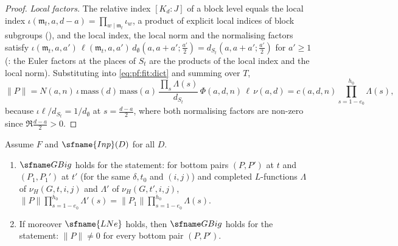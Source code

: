 \begin{proof}
\emph{Local factors.} The relative index $[K_d:J]$ of a block level equals the local index
$\iota(\mathfrak m_t,a,d-a)=\prod_{w\mid\mathfrak m_t}\iota_w$, a product of explicit local indices of block subgroups
(), and the local index, the local norm and the normalising factors satisfy
$\iota(\mathfrak m_t,a,a')\,\ell(\mathfrak m_t,a,a')\,d_\emptyset(a,a+a';\tfrac{a'}2)=d_{S_t}(a,a+a';\tfrac{a'}2)$ for $a'\ge1$
(: the Euler factors at the places of $S_t$ are the
products of the local index and the local norm). Substituting into \eqref{eq:pf:fit:dict} and summing over $T$,
\[
\|P\|=N(a,n)\,\iota\,\mathrm{mass}(d)\,\mathrm{mass}(a)\,\frac{\prod_s\Lambda(s)}{d_{S_t}}\,\Phi(a,d,n)\,\ell\,\nu(a,d)
=c(a,d,n)\prod_{s=1-e_0}^{h_0}\Lambda(s),
\]
because $\iota\ell/d_{S_t}=1/d_\emptyset$ at $s=\tfrac{d-a}2$, where both normalising factors are non-zero since $\Re\tfrac{d-a}2>0$.
\end{proof}

\begin{lemma}\label{pf:fit:petratio}
Assume $F$ and $\sfname{Inp}(D)$ for all $D$.
\begin{enumerate}[label=(\alph*)]
\item $\fitGBig$ holds for the statement: for bottom pairs $(P,P')$ at $t$ and $(P_1,P_1')$ at $t'$ (for the same $\delta,t_0$
and $(i,j)$) and completed $L$-functions $\Lambda$ of $\nu_H(G,t,i,j)$ and $\Lambda'$ of $\nu_H(G,t',i,j)$,
$\|P\|\prod_{s=1-e_0}^{h_0}\Lambda'(s)=\|P_1\|\prod_{s=1-e_0}^{h_0}\Lambda(s)$.
\item If moreover $\sfname{LNe}$ holds, then $\fitGBig$ holds for the statement: $\|P\|\ne0$ for every bottom pair $(P,P')$.
\end{enumerate}
\end{lemma}


